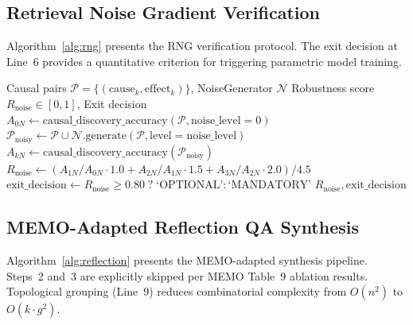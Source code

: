 \documentclass[11pt,a4paper]{article}
\begin{document}
\subsection{Retrieval Noise Gradient Verification}

Algorithm~\ref{alg:rng} presents the RNG verification protocol. The exit decision at Line~6 provides a quantitative criterion for triggering parametric model training.

\begin{algorithm}[H]
\caption{Retrieval Noise Gradient (RNG) Verification}
\label{alg:rng}
\begin{algorithmic}[1]
\Require Causal pairs \(\mathcal{P} = \{(\text{cause}_k, \text{effect}_k)\}\), NoiseGenerator \(\mathcal{N}\)
\Ensure Robustness score \(R_{\text{noise}} \in [0, 1]\), Exit decision
\State \(A_{0N} \gets \text{causal\_discovery\_accuracy}(\mathcal{P}, \text{noise\_level}=0)\)
    \State \(\mathcal{P}_{\text{noisy}} \gets \mathcal{P} \cup \mathcal{N}.\text{generate}(\mathcal{P}, \text{level}=\text{noise\_level})\)
    \State \(A_{kN} \gets \text{causal\_discovery\_accuracy}(\mathcal{P}_{\text{noisy}})\)
\EndFor
\State \(R_{\text{noise}} \gets (A_{1N}/A_{0N} \cdot 1.0 + A_{2N}/A_{1N} \cdot 1.5 + A_{3N}/A_{2N} \cdot 2.0) / 4.5\)
\State \(\text{exit\_decision} \gets R_{\text{noise}} \geq 0.80 \;?\; \text{`OPTIONAL'} : \text{`MANDATORY'}\)
\State \Return \(R_{\text{noise}}, \text{exit\_decision}\)
\end{algorithmic}
\end{algorithm}

\subsection{MEMO-Adapted Reflection QA Synthesis}

Algorithm~\ref{alg:reflection} presents the MEMO-adapted synthesis pipeline. Steps~2 and~3 are explicitly skipped per MEMO Table~9 ablation results. Topological grouping (Line~9) reduces combinatorial complexity from \(O(n^2)\) to \(O(k \cdot g^2)\).
\end{document}
